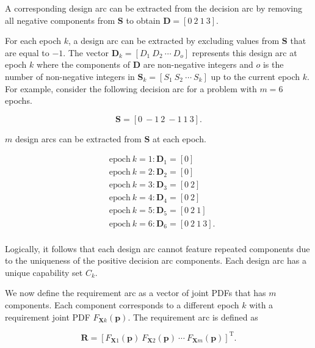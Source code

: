 A corresponding design arc can be extracted from the decision arc by removing all negative components from $\mathbf{S}$ to obtain $\mathbf{D} = \left[0 ~ 2 ~ 1 ~ 3\right]$. 

For each epoch $k$, a design arc can be extracted by excluding values from $\mathbf{S}$ that are equal to $-1$. The vector $\mathbf{D}_k = \left[D_1 ~ D_2 ~ \cdots ~ D_o\right]$ represents this design arc at epoch $k$ where the components of $\mathbf{D}$ are non-negative integers and $o$ is the number of non-negative integers in $\mathbf{S}_k = \left[S_1 ~ S_2 ~ \cdots ~ S_k\right]$ up to the current epoch $k$. For example, consider the following decision arc for a problem with $m=6$ epochs.

\begin{equation*} \label{eq:decisionarcex}
	\mathbf{S} = \left[0 ~ -1 ~ 2 ~ -1 ~ 1 ~ 3\right].
\end{equation*}

$m$ design arcs can be extracted from $\mathbf{S}$ at each epoch.

\begin{equation*}
	\begin{aligned}
		& \mathrm{epoch~} k=1: \mathbf{D}_1 = \left[0\right]\\
		& \mathrm{epoch~} k=2: \mathbf{D}_2 = \left[0\right]\\
		& \mathrm{epoch~} k=3: \mathbf{D}_3 = \left[0 ~ 2\right]\\
		& \mathrm{epoch~} k=4: \mathbf{D}_4 = \left[0 ~ 2\right]\\
		& \mathrm{epoch~} k=5: \mathbf{D}_5 = \left[0 ~ 2 ~ 1\right]\\
		& \mathrm{epoch~} k=6: \mathbf{D}_6 = \left[0 ~ 2 ~ 1 ~ 3\right].\\
	\end{aligned}
\end{equation*}

Logically, it follows that each design arc cannot feature repeated components due to the uniqueness of the positive decision arc components. Each design arc has a unique capability set $C_k$.

We now define the requirement arc as a vector of joint \acp{PDF} that has $m$ components. Each component corresponds to a different epoch $k$ with a requirement joint \ac{PDF} $F_{\mathbf{X}k}(\mathbf{p})$. The requirement arc is defined as

\begin{equation} \label{eq:requirementarc}
	\mathbf{R} = \left[F_{\mathbf{X}1}(\mathbf{p}) ~ F_{\mathbf{X}2}(\mathbf{p}) ~ \cdots ~ F_{\mathbf{X}m}(\mathbf{p})\right]^{\mathrm{T}}.
\end{equation}

